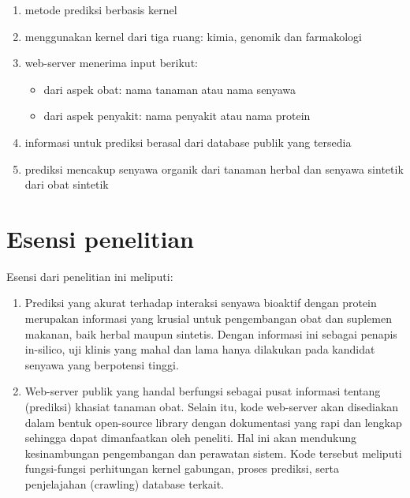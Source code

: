 \begin{enumerate} [topsep=0mm]
\itemsep0mm
\item metode prediksi berbasis kernel
\item menggunakan kernel dari tiga ruang: kimia, genomik dan farmakologi
\item web-server menerima input berikut: 
	\begin{itemize} [topsep=0mm]
	\itemsep0mm
	\item dari aspek obat: nama tanaman atau nama senyawa
	\item dari aspek penyakit: nama penyakit atau nama protein
	\end{itemize}
\item informasi untuk prediksi berasal dari database publik yang tersedia
\item prediksi mencakup senyawa organik dari tanaman herbal dan senyawa sintetik dari obat sintetik
\end{enumerate}

\section{Esensi penelitian}
Esensi dari penelitian ini meliputi:

\begin{enumerate} [topsep=0mm]
\itemsep0mm
\item
Prediksi yang akurat terhadap interaksi senyawa bioaktif dengan protein merupakan informasi yang krusial untuk pengembangan obat dan suplemen makanan, baik herbal maupun sintetis.
Dengan informasi ini sebagai penapis in-silico, uji klinis yang mahal dan lama hanya dilakukan pada kandidat senyawa yang berpotensi tinggi.

\item
Web-server publik yang handal berfungsi sebagai pusat informasi tentang (prediksi) khasiat tanaman obat.
Selain itu, kode web-server akan disediakan dalam bentuk open-source library dengan dokumentasi yang rapi dan lengkap sehingga dapat dimanfaatkan oleh peneliti.
Hal ini akan mendukung kesinambungan pengembangan dan perawatan sistem.
Kode tersebut meliputi fungsi-fungsi perhitungan kernel gabungan, proses prediksi, serta penjelajahan (crawling) database terkait.
\end{enumerate}
